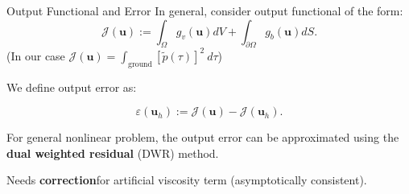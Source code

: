 \documentclass{beamer}
\newcounter{sectionframes}
\newcommand{\setsectionframes}[1]{%
  \setcounter{sectionframes}{#1}%
}
\newcounter{sectionframecount}
\begin{document}
\setsectionframes{5}

\begin{frame}[t]{Output Functional and Error}
  In general, consider output functional of the form:
  \begin{equation}
    \mathcal{J}(\boldsymbol{u}) := \int_{\Omega} g_v(\boldsymbol{u})dV + \int_{\partial \Omega} g_b(\boldsymbol{u})dS.
    \label{e:general_output_functional}
  \end{equation}
(In our case $\mathcal{J}(\boldsymbol{u}) = \int_{\text{ground}} [\tilde{p}(\tau)]^2~d\tau$)

{
\vspace{10pt}
We define output error as:

\begin{equation}
  \varepsilon (\boldsymbol{u}_h) := \mathcal{J}(\boldsymbol{u}) - \mathcal{J}(\boldsymbol{u}_h).
\end{equation}

\vspace{8pt}
For general nonlinear problem, the output error can be approximated using the \textbf{dual weighted residual} (DWR) method.
}

{
\vspace{10pt}
Needs \textbf{correction}\footnotemark for artificial viscosity term (asymptotically consistent).
}

\end{frame}

\end{document}
